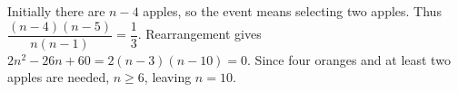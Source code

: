 Initially there are $n-4$ apples, so the event means selecting two apples. Thus $\dfrac{(n-4)(n-5)}{n(n-1)}=\dfrac{1}{3}$. Rearrangement gives $2n^2-26n+60=2(n-3)(n-10)=0$. Since four oranges and at least two apples are needed, $n\ge6$, leaving $\boxed{n=10}$.

